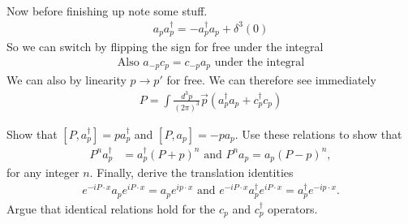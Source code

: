 \documentclass[working, oneside]{../../Preambles/tuftebook}
\begin{document}
\begin{solution}
\begin{align*}
\end{align*}
Now before finishing up note some stuff.
\begin{align*}
a_p a_p^\dagger = - a_p^\dagger a_p + \delta^3(0)
\end{align*}
So we can switch by flipping the sign for free under the integral
\begin{align*}
\text{Also } a_{-p} c_p = c_{-p} a_p \text{ under the integral}
\end{align*}
We can also by linearity $p \rightarrow p'$ for free. We can therefore see immediately
\begin{align*}
P = \int \frac{d^3p}{(2\pi)^3} \vec{p} (a_p^\dagger a_p + c_p^\dagger c_p)
\end{align*}
\end{solution}
\begin{exercise}[11]
Show that $[P, a_p^\dagger] = p a_p^\dagger$ and $[P, a_p] = -p a_p$. Use these relations to show that
\begin{align*}
P^n a_p^\dagger &= a_p^\dagger (P + p)^n \text{ and }
P^n a_p = a_p (P - p)^n,
\end{align*}
for any integer $n$. Finally, derive the translation identities
\begin{align*}
e^{-i P \cdot x} a_p e^{i P \cdot x} = a_p e^{i p \cdot x} \text{ and }
e^{-i P \cdot x} a_p^\dagger e^{i P \cdot x} = a_p^\dagger e^{-i p \cdot x}.
\end{align*}
Argue that identical relations hold for the $c_p$ and $c_p^\dagger$ operators.
\end{exercise}
\end{document}
